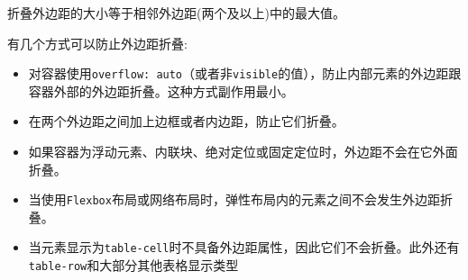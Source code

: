 折叠外边距的大小等于相邻外边距(两个及以上)中的最大值。

有几个方式可以防止外边距折叠:
\begin{itemize}
    \item 对容器使用\texttt{overflow: auto}（或者非\texttt{visible}的值），防止内部元素的外边距跟容器外部的外边距折叠。这种方式副作用最小。
    \item 在两个外边距之间加上边框或者内边距，防止它们折叠。
    \item 如果容器为浮动元素、内联块、绝对定位或固定定位时，外边距不会在它外面折叠。
    \item 当使用\texttt{Flexbox}布局或网络布局时，弹性布局内的元素之间不会发生外边距折叠。
    \item 当元素显示为\texttt{table-cell}时不具备外边距属性，因此它们不会折叠。此外还有\texttt{table-row}和大部分其他表格显示类型
\end{itemize}